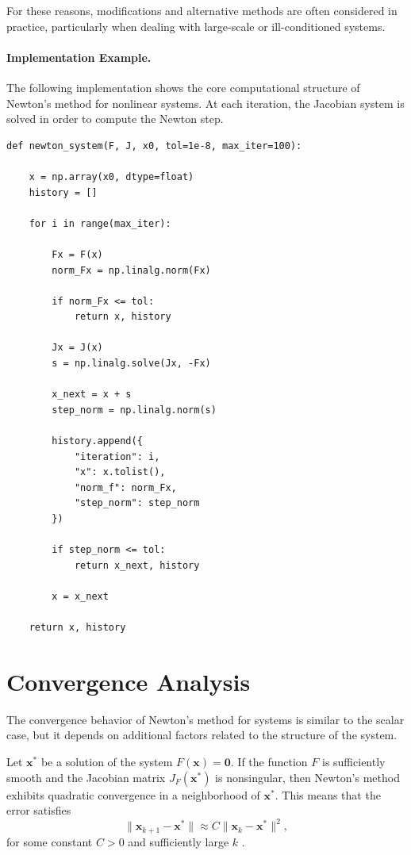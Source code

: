 For these reasons, modifications and alternative methods are often considered in practice, particularly when dealing with large-scale or ill-conditioned systems.

\paragraph{Implementation Example.}

The following implementation shows the core computational structure of Newton's method for nonlinear systems. At each iteration, the Jacobian system is solved in order to compute the Newton step.

\begin{lstlisting}
def newton_system(F, J, x0, tol=1e-8, max_iter=100):

    x = np.array(x0, dtype=float)
    history = []

    for i in range(max_iter):

        Fx = F(x)
        norm_Fx = np.linalg.norm(Fx)

        if norm_Fx <= tol:
            return x, history

        Jx = J(x)
        s = np.linalg.solve(Jx, -Fx)

        x_next = x + s
        step_norm = np.linalg.norm(s)

        history.append({
            "iteration": i,
            "x": x.tolist(),
            "norm_f": norm_Fx,
            "step_norm": step_norm
        })

        if step_norm <= tol:
            return x_next, history

        x = x_next

    return x, history
\end{lstlisting}

\section{Convergence Analysis}

The convergence behavior of Newton's method for systems is similar to the scalar case, but it depends on additional factors related to the structure of the system.

Let \( \mathbf{x}^* \) be a solution of the system \( F(\mathbf{x}) = \mathbf{0} \). If the function \( F \) is sufficiently smooth and the Jacobian matrix \( J_F(\mathbf{x}^*) \) is nonsingular, then Newton's method exhibits quadratic convergence in a neighborhood of \( \mathbf{x}^* \). This means that the error satisfies
\begin{equation}
\|\mathbf{x}_{k+1} - \mathbf{x}^*\| \approx C \|\mathbf{x}_k - \mathbf{x}^*\|^2,
\end{equation}
for some constant \( C > 0 \) and sufficiently large \( k \) \cite{kelley}.


